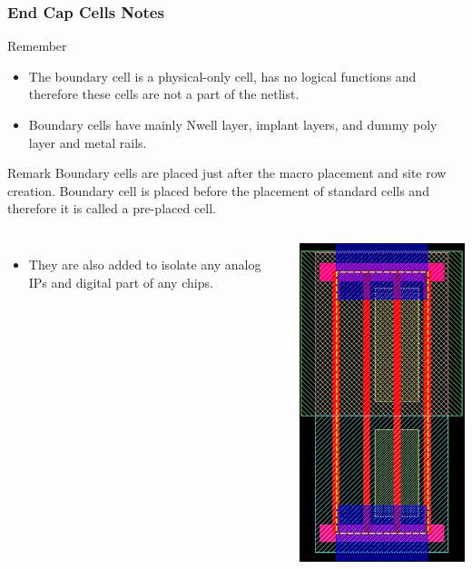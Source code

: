 \documentclass{beamer}
\begin{document}
\begin{frame}
	\frametitle{End Cap Cells Notes}
	
	\begin{block}{Remember}
		\begin{itemize}
			\item The boundary cell is a physical-only cell, has no logical functions and therefore these cells are not a part of the netlist.
			\item Boundary cells have mainly Nwell layer, implant layers, and dummy poly layer and metal rails.
		\end{itemize}
	\end{block}
	
	\begin{alertblock}{Remark}
		Boundary cells are placed just after the macro placement and site row creation. Boundary cell is placed before the placement of standard cells and therefore it is called a pre-placed cell.
	\end{alertblock}
		\begin{columns}
	\begin{itemize}
		\item They are also added to isolate any analog IPs and digital part of any chips.
	\end{itemize}
	
	\begin{center}
		\includegraphics[width=0.15 \textwidth]{endcapCell}
	\end{center}	
\end{columns}
	
\end{frame}
\end{document}
